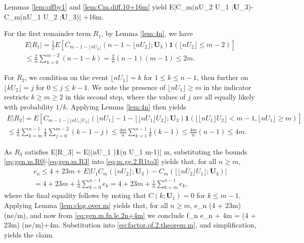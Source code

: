 \documentclass[12pt]{article}
\begin{document}
Lemmas \ref{lem:offby1} and \ref{lem:Cm.diff.10+16m} yield 
\bea \label{eq:gen.m.R0}
E|C_m(\lfloor \lfloor nU_2 \rfloor U_1 \rfloor;\textbf{U}_3)-C_m(\lfloor \lfloor nU_1 \rfloor U_2 \rfloor;\textbf{U}_3)| +16m.
\ena


For the first remainder term $R_1$, by Lemma \ref{lem:4n}, we have 
\begin{multline} \label{eq:gen.m.R1}
E|R_1| = \frac{1}{2}E[C_{m-1-\lfloor nU_2 \rfloor}(n-1-\lfloor nU_2 \rfloor;\textbf{U}_3)\textbf{1}(\lfloor nU_2 \rfloor \le m-2)]\\
\le \frac{2}{n}\sum_{k=0}^{m-2}(n-1-k)=\frac{2}{n}(n-1)(m-1) \le 2m. 
\end{multline}

For $R_2$, we condition on the event $\lfloor n U_1 \rfloor =k$ for $1 \le k \le n-1$, then further on $\lfloor kU_2 \rfloor=j$ for $0 \le j \le k-1$. We note the presence of $\lfloor n U_1 \rfloor \ge m$ in the indicator restricts $k \ge m \ge 2$ in this second step, where the values of $j$ are all equally likely with probability $1/k$. Applying Lemma \ref{lem:4n} then yields
\begin{multline} \label{eq:gen.m.R2}
E|R_2| = E[C_{m-1  - \lfloor  \lfloor nU_1 \rfloor U_2 \rfloor}( \lfloor nU_1 \rfloor-1  - \lfloor  \lfloor nU_1 \rfloor U_2 \rfloor;\textbf{U}_3)\textbf{1}(\lfloor \lfloor nU_1 \rfloor U_2 \rfloor < m-1, \lfloor nU_1 \rfloor \ge m)]\\
\le \frac{4}{n}\sum_{k=m}^{n-1}\frac{1}{k}\sum_{j=0}^{m-2} (k-1-j) \le \frac{4m}{n}\sum_{k=1}^{n-1}\frac{1}{k}(k-1)\le \frac{4m}{n}(n-1) \le 4m. 
\end{multline}



As $R_3$ satisfies
\bea \label{eq:gen.m.R3}
E|R_3|  = E|(\lfloor nU_1 )\textbf{1}(\lfloor n U_1 \rfloor \le m-1)| \le m,
\ena
substituting the bounds \eqref{eq:gen.m.R0}-\eqref{eq:gen.m.R3} into \eqref{eq:m.ge.2.R1to3} yields that, for all $n \ge m$, 
\begin{multline*}
e_n \le 4+23m +E|U_1C_m(\lfloor nU_2 \rfloor;\textbf{U}_3) -  C_m(\lfloor \lfloor nU_2 \rfloor U_1 \rfloor;\textbf{U}_3)|\\
=4+23m+\frac{1}{n}\sum_{k=0}^{n-1}e_k =4+23m+\frac{1}{n}\sum_{k=m}^{n-1}e_k,
\end{multline*}
where the final equality follows by noting that $C(k;\textbf{U}_1)=0$ for $k \le m-1$. Applying Lemma \ref{lem:clog.over.m} yields that, for all $n \ge m$, 
\beas
e_n \le (4 + 23m) \log (ne/m), 
\enas
and now from \eqref{eq:gen.m.fn.le.2n+4m} we conclude
\beas
f_n \le e_n + 4m = (4 + 23m) \log (ne/m)+4m.
\enas Substitution into \eqref{eq:factor.of.2.theorem.m}, and simplification, yields the claim. \bbox
\end{document}

